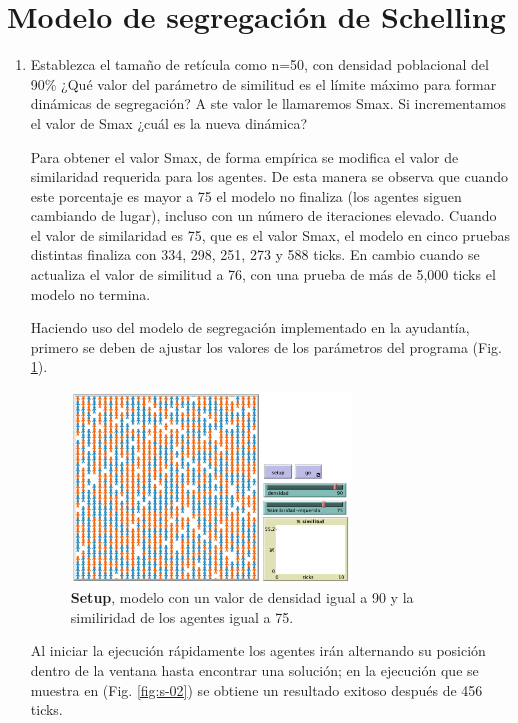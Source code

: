 \section{Modelo de segregación de Schelling}

\begin{enumerate}
	\item Establezca el tamaño de retícula como n=50, con densidad poblacional del 90\% ¿Qué valor del parámetro de similitud es el límite máximo para formar dinámicas de segregación? A ste valor le llamaremos Smax. Si incrementamos el valor de Smax ¿cuál es la nueva dinámica? 
	
	Para obtener el valor Smax, de forma empírica se modifica el valor de similaridad requerida para los agentes. De esta manera se  observa que cuando este porcentaje es mayor a 75 el modelo no finaliza (los agentes siguen cambiando de lugar), incluso con un número de iteraciones elevado. Cuando el valor de similaridad es 75, que es el valor Smax, el modelo en cinco pruebas distintas finaliza con 334, 298, 251, 273 y 588 ticks. En cambio cuando se actualiza el valor de similitud a 76, con una prueba de más de 5,000 ticks el modelo no termina.
		
	Haciendo uso del modelo de segregación implementado en la ayudantía, primero se deben de ajustar los valores de los parámetros del programa (Fig. \ref{fig:s-01}).
	
	\begin{figure}[h] 
    \centering
    \includegraphics[width=0.7\textwidth]{resources/schelling/01}    
    \caption{\textbf{Setup}, modelo con un valor de densidad igual a 90 y la similiridad de los agentes igual a 75.}
    \label{fig:s-01} 
	\end{figure} 
	
	Al iniciar la ejecución rápidamente los agentes irán alternando su posición dentro de la ventana hasta encontrar una solución; en la ejecución que se muestra en (Fig. \ref{fig:s-02}) se obtiene un resultado exitoso después de 456 ticks.
	

\end{enumerate}

